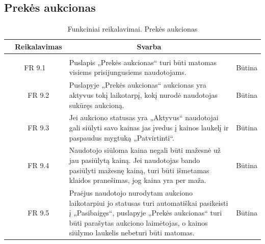 \documentclass{VUMIFPSkursinis}
\begin{document}
	\subsection{Prekės aukcionas}
	\begin{table}[H]
		\caption{Funkciniai reikalavimai. Prekės aukcionas}
		\begin{tabular}{|p{1cm}|p{1cm}|p{}|p{}|}
			\hline
			\rowcolor{gray!50}
			\multicolumn{2}{|c|}{{\bfseries Kodas}}&
			\multicolumn{1}{c|}{{\bfseries Reikalavimas}}&
			\multicolumn{1}{c|}{{\bfseries Svarba}}\\
			\hline
			\rowcolor{lightgray}
			\multicolumn{4}{|c|}{Prekės aukcionas}\\
			\hline
			\multicolumn{2}{|c|}{FR 9.1}&
			{Puslapis „Prekės aukcionas“ turi būti matomas visiems prisijungusiems naudotojams.
			}&
			\multicolumn{1}{c|}{Būtina}\\
			\hline
			\multicolumn{1}{|c}{}&
			\multicolumn{1}{c|}{FR 9.2}&
			{Puslapyje „Prekės aukcionas“ aukcionas yra aktyvus tokį laikotarpį, kokį nurodė naudotojas sukūręs aukcioną.
			}&
			\multicolumn{1}{c|}{Būtina}\\
			\hline
			\multicolumn{1}{|c}{}&
			\multicolumn{1}{c|}{FR 9.3}&
			{Jei aukciono statusas yra „Aktyvus“ naudotojai gali siūlyti savo kainas jas įvedus į kainos laukelį ir paspaudus mygtuką „Patvirtinti“.
			}&
			\multicolumn{1}{c|}{Būtina}\\
			\hline
			\multicolumn{1}{|c}{}&
			\multicolumn{1}{c|}{FR 9.4}&
			{Naudotojo siūloma kaina negali būti mažesnė už jau pasiūlytą kainą. Jei naudotojas bando pasiūlyti mažesnę kainą, turi būti išmetamas klaidos pranešimas, jog kaina yra per maža.
			}&
			\multicolumn{1}{c|}{Būtina}\\
			\hline
			\multicolumn{1}{|c}{}&
			\multicolumn{1}{c|}{FR 9.5}&
			{Praėjus naudotojo nurodytam aukciono laikotarpiui jo statusas turi automatiškai pasikeisti į „Pasibaigęs“, puslapyje „Prekės aukcionas“ turi būti parašytas aukciono laimėtojas, o kainos siūlymo laukelis nebeturi būti matomas.
			}&
			\multicolumn{1}{c|}{Būtina}\\
			\hline
		\end{tabular}
	\end{table}
\end{document}
